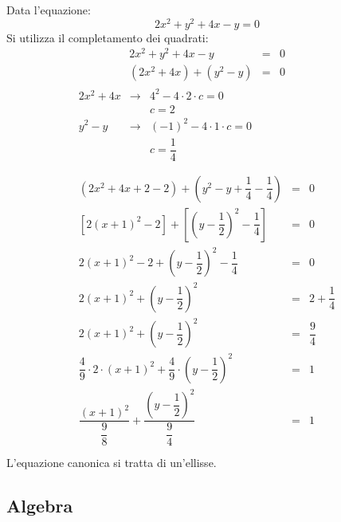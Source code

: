 \documentclass[a4paper]{article}
\begin{document}
	\noindent
	Data l'equazione:
	\begin{equation*}
		2x^{2} + y^{2} + 4x - y = 0
	\end{equation*}
	Si utilizza il completamento dei quadrati:
	\begin{equation*}
		\begin{array}{rcl}
			2x^{2} + y^{2} + 4x - y &=& 0 \\ [.5em]
			\left(2x^{2} + 4x\right) + \left(y^{2} - y\right) &=& 0
		\end{array}
	\end{equation*}
	\begin{gather*}
		\begin{array}{rcl}
			2x^{2} + 4x & \longrightarrow 	& 4^{2} - 4 \cdot 2 \cdot c = 0 \\ [.5em]
						&					& c = 2 \\ [1em]
			y^{2}-y 	& \longrightarrow	& \left(-1\right)^{2} - 4 \cdot 1 \cdot c = 0 \\ [.5em]
						&					& c = \dfrac{1}{4}
		\end{array} \\ \\
		\begin{array}{rcl}
			\left(2x^{2} + 4x + 2 - 2\right) + \left(y^{2} - y + \dfrac{1}{4} - \dfrac{1}{4}\right) &=& 0 \\ [1em]
			\left[2\left(x+1\right)^{2} - 2\right] + \left[\left(y-\dfrac{1}{2}\right)^{2} - \dfrac{1}{4}\right] &=& 0 \\ [1em]
			2\left(x+1\right)^{2} - 2 + \left(y-\dfrac{1}{2}\right)^{2} - \dfrac{1}{4} &=& 0 \\ [1em]
			2\left(x+1\right)^{2} + \left(y-\dfrac{1}{2}\right)^{2} &=& 2 + \dfrac{1}{4} \\ [1em]
			2\left(x+1\right)^{2} + \left(y-\dfrac{1}{2}\right)^{2} &=& \dfrac{9}{4} \\ [1em]
			\dfrac{4}{9} \cdot 2 \cdot \left(x+1\right)^{2} + \dfrac{4}{9} \cdot \left(y-\dfrac{1}{2}\right)^{2} &=& 1 \\ [1em]
			\dfrac{\left(x+1\right)^{2}}{\dfrac{9}{8}} + \dfrac{\left(y-\dfrac{1}{2}\right)^{2}}{\dfrac{9}{4}} &=& 1 \\ [1em]
		\end{array}
	\end{gather*}
	L'equazione canonica si tratta di un'ellisse.\newpage

	\subsection{Algebra}\label{subsection: algebra}
\end{document}
